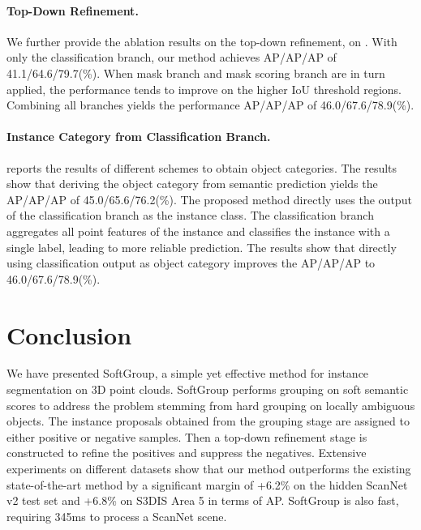 \documentclass[10pt,twocolumn,letterpaper]{article}
\begin{document}
	\paragraph{Top-Down Refinement.}
	We further provide the ablation results on the top-down refinement, on . With only the classification branch, our method achieves AP/AP/AP of 41.1/64.6/79.7(\%). When mask branch and mask scoring branch are in turn applied, the performance tends to improve on the higher IoU threshold regions. Combining all branches yields the performance  AP/AP/AP of 46.0/67.6/78.9(\%).
	
	\paragraph{Instance Category from Classification Branch.}
	 reports the results of different schemes to obtain object categories. The results show that deriving the object category from semantic prediction yields the AP/AP/AP of 45.0/65.6/76.2(\%). The proposed method directly uses the output of the classification branch as the instance class. The classification branch aggregates all point features of the instance and classifies the instance with a single label, leading to more reliable prediction. The results show that directly using classification output as object category improves the AP/AP/AP to 46.0/67.6/78.9(\%).
	
	\section{Conclusion}
	We have presented SoftGroup, a simple yet effective method for instance segmentation on 3D point clouds. SoftGroup performs grouping on soft semantic scores to address the problem stemming from hard grouping on locally ambiguous objects. The instance proposals obtained from the grouping stage are assigned to either positive or negative samples. Then a top-down refinement stage is constructed to refine the positives and suppress the negatives. Extensive experiments on different datasets show that our method outperforms the existing state-of-the-art method by a significant margin of +6.2\% on the hidden ScanNet v2 test set and +6.8\% on S3DIS Area 5 in terms of AP. SoftGroup is also fast, requiring 345ms to process a ScanNet scene.
	
{\small
		
		
	}
	
\end{document}
